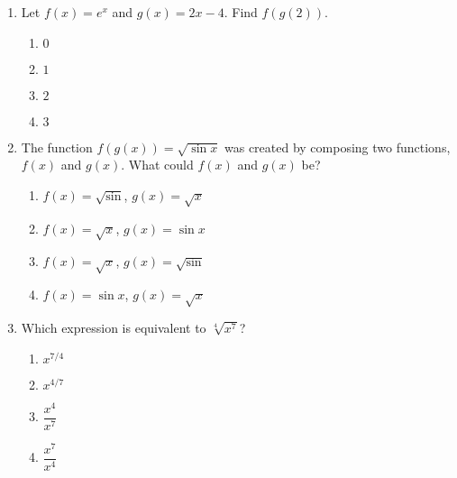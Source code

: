 \documentclass{article}
\begin{document}
\begin{enumerate}




\item Let $f(x) = e^x$ and $g(x)=2x-4$. Find $f(g(2))$.


  \begin{enumerate}
  \item $0$
  \item $1$  %
  \item $2$
  \item $3$
  \end{enumerate}
  

\item The function $f(g(x))=\sqrt{\sin x}$ was created by composing two functions, $f(x)
$ and $g(x)$. What could $f(x)$ and $g(x)$ be?

  \begin{enumerate}

  \item $f(x)=\sqrt{\sin}$, $g(x) =\sqrt{x}$
   \item $f(x)=\sqrt{x}$, $g(x) = \sin x$  %
   \item $f(x)=\sqrt{x}$, $g(x) =\sqrt{\sin}$
   \item $f(x)=\sin x$, $g(x) = \sqrt{x}$
 
  \end{enumerate}




\item Which expression is equivalent to $\sqrt[4]{x^7}$?

  \begin{enumerate}
   \item $x^{7/4}$  %
     \item $x^{4/7}$
     \item $\dfrac{x^4}{x^7}$
  \item $\dfrac{x^7}{x^4}$


\end{enumerate}
\end{enumerate}
\end{document}
